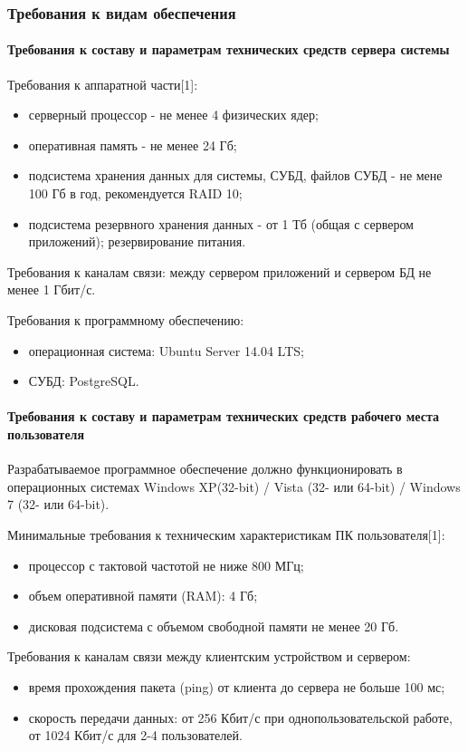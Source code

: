 \documentclass[a4paper]{extarticle}
\numberwithin{equation}{section}
\begin{document}
\subsubsection{Требования к видам обеспечения}

\paragraph{Требования к составу и параметрам технических средств сервера системы}
Требования к аппаратной части[1]:\par
\begin{itemize}
  \item серверный процессор - не менее 4 физических ядер;
  \item оперативная память - не менее 24 Гб;
  \item подсистема хранения данных для системы, СУБД, файлов СУБД - не мене 100 Гб в год, рекомендуется RAID 10;
  \item подсистема резервного хранения данных - от 1 Тб (общая с сервером приложений); резервирование питания.
\end{itemize}\par
Требования к каналам связи: между сервером приложений и сервером БД не менее 1 Гбит/с.\par
Требования к программному обеспечению:\par
\begin{itemize}
  \item операционная система: Ubuntu Server 14.04 LTS;
  \item СУБД: PostgreSQL.
\end{itemize}\par

\paragraph{Требования к составу и параметрам технических средств рабочего места пользователя}
Разрабатываемое программное обеспечение должно функционировать в операционных системах Windows XP(32-bit) / Vista (32- или 64-bit) / Windows 7 (32- или 64-bit).\par
Минимальные требования к техническим характеристикам ПК пользователя[1]:\par
\begin{itemize}
  \item процессор с тактовой частотой не ниже 800 МГц;
  \item объем оперативной памяти (RAM): 4 Гб;
  \item дисковая подсистема с объемом свободной памяти не менее 20 Гб.
\end{itemize}\par
Требования к каналам связи между клиентским устройством и сервером:\par
\begin{itemize}
  \item время прохождения пакета (ping) от клиента до сервера не больше 100 мс;
  \item скорость передачи данных: от 256 Кбит/с при однопользовательской работе, от 1024 Кбит/с для 2-4 пользователей.
\end{itemize}
\end{document}
